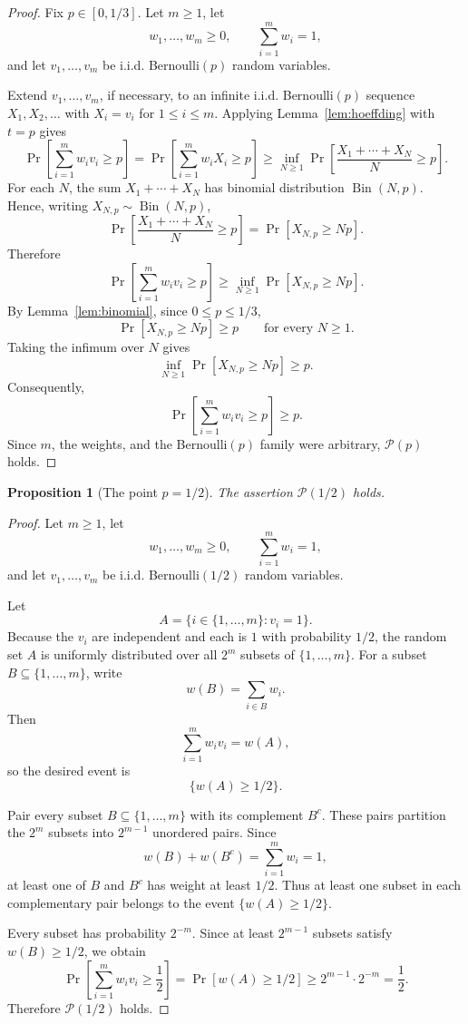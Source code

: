 \documentclass[12pt]{article}
\theoremstyle{definition}
\theoremstyle{plain}
\newtheorem{proposition}[definition]{Proposition}
\theoremstyle{remark}
\begin{document}
\begin{proof}
Fix \(p\in[0,1/3]\). Let \(m\ge1\), let
\[
w_1,\ldots,w_m\ge0,\qquad \sum_{i=1}^{m}w_i=1,
\]
and let \(v_1,\ldots,v_m\) be i.i.d. Bernoulli\((p)\) random variables.

Extend \(v_1,\ldots,v_m\), if necessary, to an infinite i.i.d. Bernoulli\((p)\) sequence \(X_1,X_2,\ldots\) with \(X_i=v_i\) for \(1\le i\le m\). Applying Lemma~\ref{lem:hoeffding} with \(t=p\) gives
\[
\Pr\!\left[\sum_{i=1}^{m}w_i v_i\ge p\right]
=
\Pr\!\left[\sum_{i=1}^{m}w_i X_i\ge p\right]
\ge
\inf_{N\ge1}
\Pr\!\left[\frac{X_1+\cdots+X_N}{N}\ge p\right].
\]
For each \(N\), the sum \(X_1+\cdots+X_N\) has binomial distribution \(\operatorname{Bin}(N,p)\). Hence, writing \(X_{N,p}\sim\operatorname{Bin}(N,p)\),
\[
\Pr\!\left[\frac{X_1+\cdots+X_N}{N}\ge p\right]
=
\Pr[X_{N,p}\ge Np].
\]
Therefore
\[
\Pr\!\left[\sum_{i=1}^{m}w_i v_i\ge p\right]
\ge
\inf_{N\ge1}\Pr[X_{N,p}\ge Np].
\]
By Lemma~\ref{lem:binomial}, since \(0\le p\le1/3\),
\[
\Pr[X_{N,p}\ge Np]\ge p
\qquad\text{for every }N\ge1.
\]
Taking the infimum over \(N\) gives
\[
\inf_{N\ge1}\Pr[X_{N,p}\ge Np]\ge p.
\]
Consequently,
\[
\Pr\!\left[\sum_{i=1}^{m}w_i v_i\ge p\right]\ge p.
\]
Since \(m\), the weights, and the Bernoulli\((p)\) family were arbitrary, \(\mathcal P(p)\) holds.
\end{proof}


\begin{proposition}[The point \(p=1/2\)]\label{prop:halfp}
The assertion \(\mathcal P(1/2)\) holds.
\end{proposition}

\begin{proof}
Let \(m\ge1\), let
\[
w_1,\ldots,w_m\ge0,\qquad \sum_{i=1}^{m}w_i=1,
\]
and let \(v_1,\ldots,v_m\) be i.i.d. Bernoulli\((1/2)\) random variables.

Let
\[
A=\{i\in\{1,\ldots,m\}: v_i=1\}.
\]
Because the \(v_i\) are independent and each is \(1\) with probability \(1/2\), the random set \(A\) is uniformly distributed over all \(2^m\) subsets of \(\{1,\ldots,m\}\). For a subset \(B\subseteq\{1,\ldots,m\}\), write
\[
w(B)=\sum_{i\in B}w_i.
\]
Then
\[
\sum_{i=1}^{m}w_i v_i=w(A),
\]
so the desired event is
\[
\{w(A)\ge1/2\}.
\]

Pair every subset \(B\subseteq\{1,\ldots,m\}\) with its complement \(B^c\). These pairs partition the \(2^m\) subsets into \(2^{m-1}\) unordered pairs. Since
\[
w(B)+w(B^c)=\sum_{i=1}^{m}w_i=1,
\]
at least one of \(B\) and \(B^c\) has weight at least \(1/2\). Thus at least one subset in each complementary pair belongs to the event \(\{w(A)\ge1/2\}\).

Every subset has probability \(2^{-m}\). Since at least \(2^{m-1}\) subsets satisfy \(w(B)\ge1/2\), we obtain
\[
\Pr\!\left[\sum_{i=1}^{m}w_i v_i\ge\frac12\right]
=
\Pr[w(A)\ge1/2]
\ge
2^{m-1}\cdot 2^{-m}
=
\frac12.
\]
Therefore \(\mathcal P(1/2)\) holds.
\end{proof}
\end{document}
